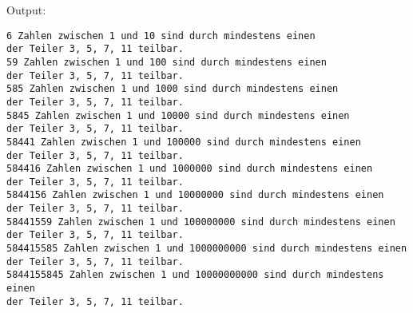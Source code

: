 \documentclass[a4paper]{scrartcl}
\begin{document}
Output:

\begin{lstlisting}
6 Zahlen zwischen 1 und 10 sind durch mindestens einen
der Teiler 3, 5, 7, 11 teilbar.
59 Zahlen zwischen 1 und 100 sind durch mindestens einen
der Teiler 3, 5, 7, 11 teilbar.
585 Zahlen zwischen 1 und 1000 sind durch mindestens einen
der Teiler 3, 5, 7, 11 teilbar.
5845 Zahlen zwischen 1 und 10000 sind durch mindestens einen
der Teiler 3, 5, 7, 11 teilbar.
58441 Zahlen zwischen 1 und 100000 sind durch mindestens einen
der Teiler 3, 5, 7, 11 teilbar.
584416 Zahlen zwischen 1 und 1000000 sind durch mindestens einen
der Teiler 3, 5, 7, 11 teilbar.
5844156 Zahlen zwischen 1 und 10000000 sind durch mindestens einen
der Teiler 3, 5, 7, 11 teilbar.
58441559 Zahlen zwischen 1 und 100000000 sind durch mindestens einen
der Teiler 3, 5, 7, 11 teilbar.
584415585 Zahlen zwischen 1 und 1000000000 sind durch mindestens einen
der Teiler 3, 5, 7, 11 teilbar.
5844155845 Zahlen zwischen 1 und 10000000000 sind durch mindestens einen
der Teiler 3, 5, 7, 11 teilbar.
\end{lstlisting}      
\end{document}

